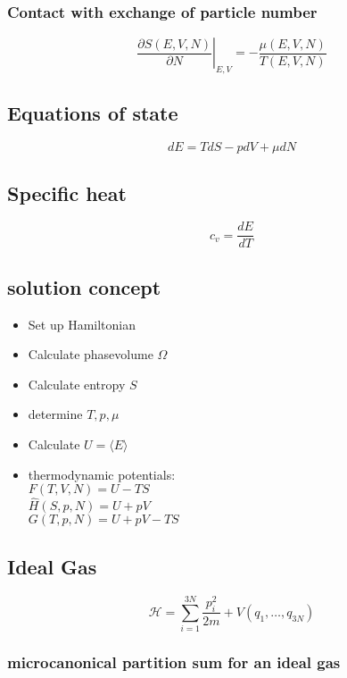 \subsubsection*{Contact with exchange of particle number}

\[
    \left. \frac{\partial S(E,V,N)}{\partial N} \right|_{E,V} = - \frac{\mu (E,V,N)}{T(E,V,N)}
\]

\subsection*{Equations of state}

\[
    dE = TdS - pdV + \mu dN
\]


\subsection*{Specific heat}
\[
    c_v = \frac{dE}{dT}
\]
\subsection*{solution concept}

\begin{itemize}
    \itemsep 0pt
    \item Set up Hamiltonian
    \item Calculate phasevolume $\Omega$
    \item Calculate entropy $S$
    \item determine $T,p,\mu$
    \item Calculate $U = \langle E \rangle$
    \item thermodynamic potentials: \\
            $F(T,V,N) = U-TS$ \\
            $\hat{H}(S,p,N) = U + pV$ \\
            $G(T,p,N) = U + pV -TS$
\end{itemize}


\subsection*{Ideal Gas}

\[
    \mathcal{H} = \sum_{i=1}^{3N} \frac{p_i^2}{2m} + V(q_1, \dots, q_{3N})
\]

\subsubsection*{microcanonical partition sum for an ideal gas}

